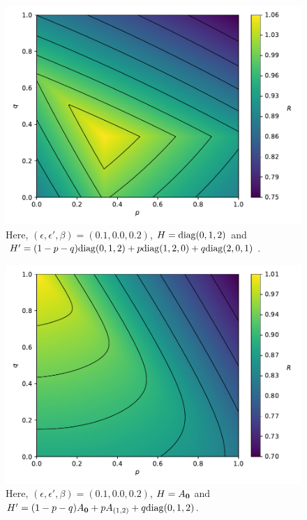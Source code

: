 \documentclass[pra,
aps,
twocolumn,
superscriptaddress,
groupedaddress,
nofootinbib,
reprint
]{revtex4-1}
\begin{document}
\begin{figure}
    \centering
    \includegraphics[scale=0.4]{figs/test/R_vs_H.pdf}
    \caption{Here, $(\epsilon, \epsilon', \beta) = (0.1, 0.0, 0.2)$, $H = {\rm{diag}}(0,1,2)$ and $H' = (1-p-q){\rm{diag}}(0,1,2)+p{\rm{diag}}(1,2,0)+q{\rm{diag}}(2,0,1)$.
    }
    \label{fig:rvsh}
\end{figure}

\begin{figure}
    \centering
    \includegraphics[scale=0.4]{figs/test/R_vs_A.pdf}
    \caption{Here, $(\epsilon, \epsilon', \beta) = (0.1, 0.0, 0.2)$, $H = A_{\bm{0}}$ and $H' = (1-p-q)A_{\bm{0}}+pA_{(1,2)}+q{\rm{diag}}(0,1,2)$.
    }
    \label{fig:rvsa}
\end{figure}
\end{document}

